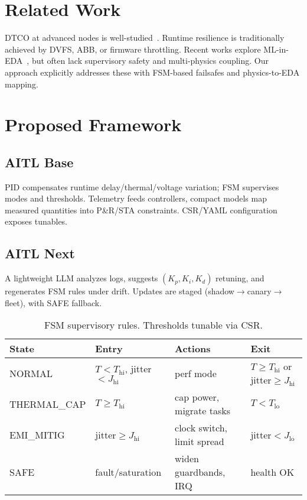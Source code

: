 \documentclass[conference]{IEEEtran}
\begin{document}
\section{Related Work}
DTCO at advanced nodes is well-studied~\cite{yakimets,irds}. Runtime resilience is traditionally achieved by DVFS, ABB, or firmware throttling. Recent works explore ML-in-EDA~\cite{iccad-ml-pnr-2022,aspdac-llm-eda-2025}, but often lack supervisory safety and multi-physics coupling. Our approach explicitly addresses these with FSM-based failsafes and physics-to-EDA mapping.

\section{Proposed Framework}
\subsection{AITL Base}
PID compensates runtime delay/thermal/voltage variation; FSM supervises modes and thresholds. Telemetry feeds controllers, compact models map measured quantities into P\&R/STA constraints. CSR/YAML configuration exposes tunables.

\subsection{AITL Next}
A lightweight LLM analyzes logs, suggests $(K_p,K_i,K_d)$ retuning, and regenerates FSM rules under drift. Updates are staged (shadow$\rightarrow$canary$\rightarrow$fleet), with SAFE fallback.

\begin{table}[t]
\centering
\caption{FSM supervisory rules. Thresholds tunable via CSR.}
\label{tab:fsm}
\begin{tabular}{@{}llll@{}}
\toprule
State & Entry & Actions & Exit \\
\midrule
NORMAL & $T<T_\mathrm{hi}$, jitter$<J_\mathrm{hi}$ & perf mode & $T\ge T_\mathrm{hi}$ or jitter$\ge J_\mathrm{hi}$ \\
THERMAL\_CAP & $T\ge T_\mathrm{hi}$ & cap power, migrate tasks & $T<T_\mathrm{lo}$ \\
EMI\_MITIG & jitter$\ge J_\mathrm{hi}$ & clock switch, limit spread & jitter$<J_\mathrm{lo}$ \\
SAFE & fault/saturation & widen guardbands, IRQ & health OK \\
\bottomrule
\end{tabular}
\end{table}
\end{document}
